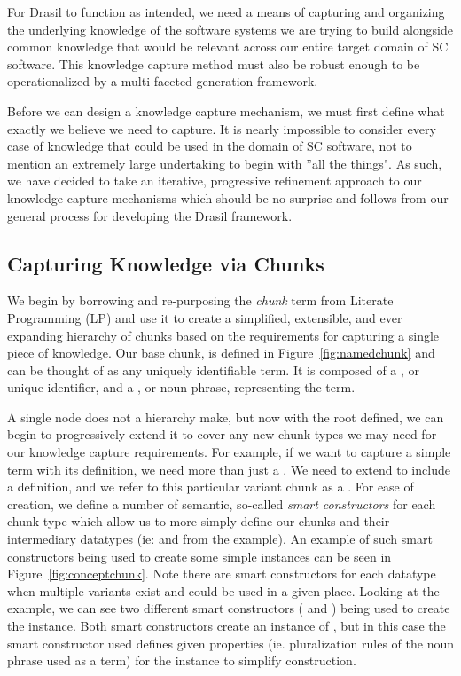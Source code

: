 For Drasil to function as intended, we need a means of capturing and organizing 
the underlying knowledge of the software systems we are trying to build 
alongside common knowledge that would be relevant across our entire target 
domain of SC software. This knowledge capture method must also be robust enough 
to be operationalized by a multi-faceted generation framework.

Before we can design a knowledge capture mechanism, we must first define what 
exactly we believe we need to capture. It is nearly impossible to consider 
every case of knowledge that could be used in the domain of SC software, not to 
mention an extremely large undertaking to begin with ''all the things". As 
such, we have decided to take an iterative, progressive refinement approach to 
our knowledge capture mechanisms which should be no surprise and follows from 
our general process for developing the Drasil framework.

\subsection{Capturing Knowledge via Chunks}

We begin by borrowing and re-purposing the \emph{chunk} term from Literate 
Programming (LP) and use it to create a simplified, extensible, and ever 
expanding hierarchy  of chunks based on the requirements for capturing a single 
piece of knowledge. Our base chunk,  is defined in 
Figure~\ref{fig:namedchunk} and can be thought of as any uniquely identifiable 
term. It is composed of a , or unique identifier, and a 
, or noun phrase, representing the term.


A single node does not a hierarchy make, but now with the root  defined, 
we can begin to progressively extend it to cover any new chunk types we may need for our 
knowledge capture requirements. For example, if we want to capture a simple term with its 
definition, we need more than just a . We need to extend 
 to include a definition, and we refer to this particular variant chunk as 
a . For ease of creation, we define a number of semantic, so-called 
\emph{smart constructors} for each chunk type which allow us to more simply define our 
chunks and their intermediary datatypes (ie:  and  from the 
 example). An example of such smart constructors being used to create some 
simple  instances can be seen in Figure~\ref{fig:conceptchunk}. Note 
there are smart constructors for each datatype when multiple variants exist and could be 
used in a given place. Looking at the  example, we can see two different 
smart constructors ( and ) being used to create the  
instance. Both smart constructors create an instance of , but in this case the 
smart constructor used defines given properties (ie. pluralization rules of the noun phrase 
used as a term) for the instance to simplify construction.

